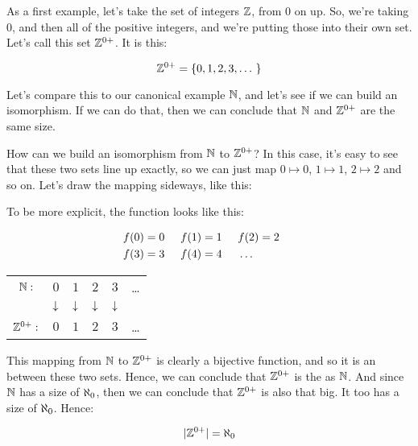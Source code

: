 \documentclass[../../../main.tex]{subfiles}
\begin{document}
\begin{fexample}

As a first example, let's take the set of integers $\Ints/$, from $0$ on up. So, we're taking $0$, and then all of the positive integers, and we're putting those into their own set. Let's call this set $\PositiveIntsAndZero/$. It is this:

\begin{equation*}
  \PositiveIntsAndZero/ = \{ 0, 1, 2, 3, \ldots~ \}
\end{equation*}

Let's compare this to our canonical example $\Nats/$, and let's see if we can build an isomorphism. If we can do that, then we can conclude that $\Nats/$ and $\PositiveIntsAndZero/$ are the same size. 

How can we build an isomorphism from $\Nats/$ to $\PositiveIntsAndZero/$? In this case, it's easy to see that these two sets line up exactly, so we can just map $0 \mapsto 0$, $1 \mapsto 1$, $2 \mapsto 2$ and so on. Let's draw the mapping sideways, like this:

\begin{aside}
  \begin{remark}
    To be more explicit, the function looks like this:
    
    \begin{align*}
      &f(0) = 0 \hskip 0.5cm
      f(1) = 1 \hskip 0.5cm
      f(2) = 2 \hskip 0.5cm
      \\
      &f(3) = 3 \hskip 0.5cm
      f(4) = 4 \hskip 0.5cm
      \ldots
    \end{align*}
  \end{remark}
\end{aside}

\begin{center}
  \begin{tabular}{ c c c c c c }
    $\Nats/:$                & $0$   & $1$   & $2$   & $3$   & \ldots \\
                             & $\v/$ & $\v/$ & $\v/$ & $\v/$ &        \\ 
    $\PositiveIntsAndZero/:$ & $0$   & $1$   & $2$   & $3$   & \ldots
  \end{tabular}
\end{center}

This mapping from $\Nats/$ to $\PositiveIntsAndZero/$ is clearly a bijective function, and so it is an  between these two sets. Hence, we can conclude that $\PositiveIntsAndZero/$ is the  as $\Nats/$. And since $\Nats/$ has a size of $\AlephZero/$, then we can conclude that $\PositiveIntsAndZero/$ is also that big. It too has a size of $\AlephZero/$. Hence:

\begin{equation*}
  \cardinality{\PositiveIntsAndZero/} = \AlephZero/
\end{equation*}

\end{fexample}
\end{document}
